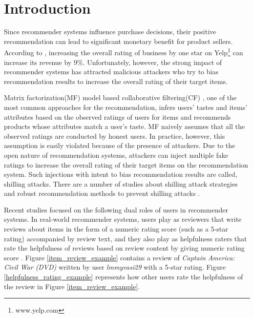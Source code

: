 \documentclass[master,english,final]{kaist-ucs}
\begin{document}
    \tableofcontents

    \listoftables

    \listoffigures



\chapter{Introduction}

Since recommender systems influence purchase decisions, their positive recommendation can lead to significant monetary benefit for product sellers.
According to \cite{yelp_study}, increasing the overall rating of business by one star on Yelp\footnote{www.yelp.com} can increase its revenue by 9\%.
Unfortunately, however, the strong impact of recommender systems has attracted malicious attackers who try to bias recommendation results to increase the overall rating of their target items.

Matrix factorization(MF) model based collaborative filtering(CF) \cite{MF_CF}, one of the most common approaches for the recommendation, infers users’ tastes and items’ attributes based on the observed ratings of users for items and recommends products whose attributes match a user’s taste.
MF naively assumes that all the observed ratings are conducted by honest users.
In practice, however, this assumption is easily violated because of the presence of attackers.
Due to the open nature of recommendation systems, attackers can inject multiple fake ratings to increase the overall rating of their target items on the recommendation system.
Such injections with intent to bias recommendation results are called, shilling attacks.
There are a number of studies about shilling attack strategies \cite{shilling_attack_1,shilling_attack_2,shilling_attack_3,shilling_attack_guide} and robust recommendation methods to prevent shilling attacks \cite{RMF,LiesAndPropaganda,UnsupervisedShilling,AttackResistant,text_duplicate, text_crowd}.

Recent studies \cite{DualRole,RQMF} focused on the following dual roles of users in recommender systems.
In real-world recommender systems, users play as reviewers that write reviews about items in the form of a numeric rating score (such as a 5-star rating) accompanied by review text, and they also play as helpfulness raters that rate the helpfulness of reviews based on review content by giving numeric rating score \cite{DualRole}.
Figure \ref{item_review_example} contains a review of \textit{Captain America: Civil War (DVD)} written by user \textit{lmmyvasi29} with a 5-star rating.
Figure \ref{helpfulness_rating_example} represents how other users rate the helpfulness of the review in Figure \ref{item_review_example}.
\end{document}
